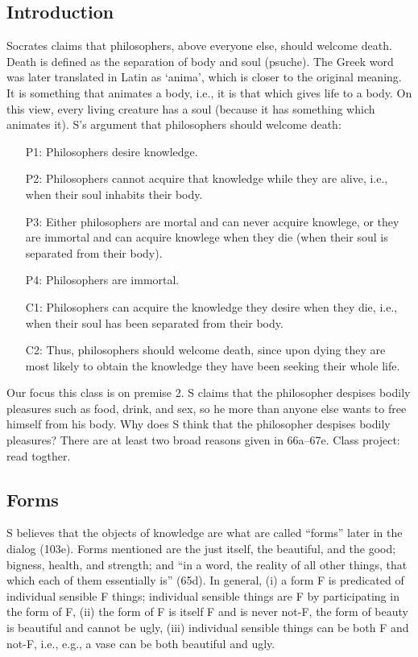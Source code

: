 \documentclass[oneside]{article}
\begin{document}
\thispagestyle{fancy}

\subsection*{Introduction}\label{introduction}

Socrates claims that philosophers, above everyone else, should welcome
death. Death is defined as the separation of body and soul (psuche).
The Greek word was later translated in Latin as `anima', which is closer
to the original meaning. It is something that animates a body, i.e., it
is that which gives life to a body. On this view, every living creature has a
soul (because it has something which animates it). S's argument that philosophers should welcome death:





\begin{itemize}
\item[P1:] Philosophers desire knowledge.
\item[P2:] Philosophers cannot acquire that knowledge while they are alive, i.e., when their soul inhabits their body.
\item[P3:] Either philosophers are mortal and can never acquire knowlege, or they are immortal and can acquire knowlege when they die (when their soul is separated from their body).
\item[P4:] Philosophers are immortal. 
\item[C1:] Philosophers can acquire the knowledge they desire when they die, i.e., when their soul has been separated from their body.
\item[C2:] Thus,  philosophers should welcome death, since upon dying they are most likely to obtain the knowledge they have been seeking their whole life.
\end{itemize}
Our focus this class is on premise 2. S claims that the philosopher despises bodily pleasures such as food, drink, and
  sex, so he more than anyone else wants to free himself from his body. Why does S think that the philosopher despises bodily pleasures? There are at least two broad reasons given in 66a--67e. Class project: read togther.

\subsection*{Forms}
S believes that the objects of knowledge are what are called ``forms'' later in the dialog (103e). Forms  mentioned are the just itself, the beautiful, and the good; bigness, health, and strength; and ``in a word, the reality of all other things, that which each of them essentially is'' (65d). In general, (i) a form F is predicated of individual sensible F things; individual sensible things are F by participating in the form of F, (ii) the form of F is itself F and is never not-F, the form of beauty is beautiful and cannot be ugly, (iii) individual sensible things can be both F and not-F, i.e., e.g., a vase can be both beautiful and ugly. 
\end{document}
